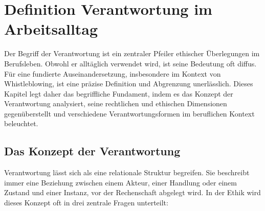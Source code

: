 \documentclass[
    12pt,               %
    a4paper,            %
    ngerman             %
]{scrartcl}
\begin{document}
\section{Definition Verantwortung im Arbeitsalltag}
\par\noindent %

Der Begriff der Verantwortung ist ein zentraler Pfeiler ethischer Überlegungen im Berufsleben. Obwohl er alltäglich verwendet wird, ist seine Bedeutung oft diffus. Für eine fundierte Auseinandersetzung, insbesondere im Kontext von Whistleblowing, ist eine präzise Definition und Abgrenzung unerlässlich. Dieses Kapitel legt daher das begriffliche Fundament, indem es das Konzept der Verantwortung analysiert, seine rechtlichen und ethischen Dimensionen gegenüberstellt und verschiedene Verantwortungsformen im beruflichen Kontext beleuchtet.

\subsection{Das Konzept der Verantwortung}
Verantwortung lässt sich als eine relationale Struktur begreifen. Sie beschreibt immer eine Beziehung zwischen einem Akteur, einer Handlung oder einem Zustand und einer Instanz, vor der Rechenschaft abgelegt wird. In der Ethik wird dieses Konzept oft in drei zentrale Fragen unterteilt:
\end{document}

